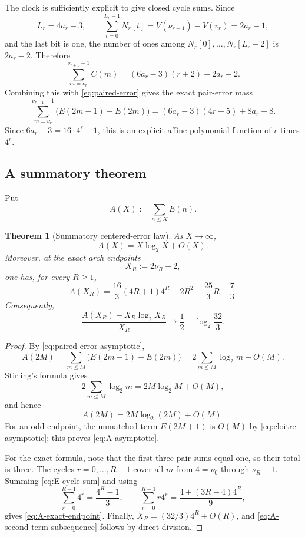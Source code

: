 \documentclass[11pt]{article}
\newtheorem{theorem}{Theorem}[section]
\theoremstyle{definition}
\theoremstyle{remark}
\begin{document}
The clock is sufficiently explicit to give closed cycle sums.  Since
\[
L_r=4a_r-3,
\qquad
\sum_{t=0}^{L_r-1}N_r[t]
=V(\nu_{r+1})-V(v_r)
=2a_r-1,
\]
and the last bit is one, the number of ones among \(N_r[0],\ldots,N_r[L_r-2]\) is \(2a_r-2\).  Therefore
\begin{equation}
\sum_{m=\nu_r}^{\nu_{r+1}-1}C(m)
=(6a_r-3)(r+2)+2a_r-2.
\label{eq:C-cycle-sum}
\end{equation}
Combining this with \eqref{eq:paired-error} gives the exact pair-error mass
\begin{equation}
{
\sum_{m=\nu_r}^{\nu_{r+1}-1}
\bigl(E(2m-1)+E(2m)\bigr)
=(6a_r-3)(4r+5)+8a_r-8.
}
\label{eq:E-cycle-sum}
\end{equation}
Since \(6a_r-3=16\cdot4^r-1\), this is an explicit affine-polynomial function of \(r\) times \(4^r\).

\subsection{A summatory theorem}

Put
\begin{equation}
A(X):=\sum_{n\le X}E(n).
\label{eq:AX}
\end{equation}

\begin{theorem}[Summatory centered-error law]
\label{thm:centered-error-asymptotic}
As \(X\to\infty\),
\begin{equation}
{
A(X)=X\log_2X+O(X).
}
\label{eq:A-asymptotic}
\end{equation}
Moreover, at the exact arch endpoints
\begin{equation}
X_R:=2\nu_R-2,
\label{eq:XR}
\end{equation}
one has, for every \(R\ge1\),
\begin{equation}
{
A(X_R)
=\frac{16}{3}(4R+1)4^R
-2R^2-\frac{25}{3}R-\frac73.
}
\label{eq:A-exact-endpoint}
\end{equation}
Consequently,
\begin{equation}
\frac{A(X_R)-X_R\log_2X_R}{X_R}
\longrightarrow
\frac12-\log_2\frac{32}{3}.
\label{eq:A-second-term-subsequence}
\end{equation}
\end{theorem}

\begin{proof}
By \eqref{eq:paired-error-asymptotic},
\[
A(2M)
=\sum_{m\le M}\bigl(E(2m-1)+E(2m)\bigr)
=2\sum_{m\le M}\log_2m+O(M).
\]
Stirling's formula gives
\[
2\sum_{m\le M}\log_2m
=2M\log_2M+O(M),
\]
and hence
\[
A(2M)=2M\log_2(2M)+O(M).
\]
For an odd endpoint, the unmatched term \(E(2M+1)\) is \(O(M)\) by \eqref{eq:cloitre-asymptotic}; this proves \eqref{eq:A-asymptotic}.

For the exact formula, note that the first three pair sums equal one, so their total is three.  The cycles \(r=0,\ldots,R-1\) cover all \(m\) from \(4=\nu_0\) through \(\nu_R-1\).  Summing \eqref{eq:E-cycle-sum} and using
\[
\sum_{r=0}^{R-1}4^r=\frac{4^R-1}{3},
\qquad
\sum_{r=0}^{R-1}r4^r
=\frac{4+(3R-4)4^R}{9},
\]
gives \eqref{eq:A-exact-endpoint}.  Finally, \(X_R=(32/3)4^R+O(R)\), and \eqref{eq:A-second-term-subsequence} follows by direct division.
\end{proof}
\end{document}
